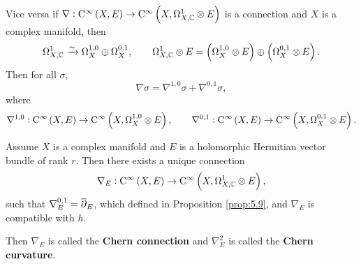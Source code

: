 Vice versa if $ \nabla : \Ci{X, E} \to \COCE{X}{1}{E} $ is a connection and $ X $ is a complex manifold, then
$$ \Omega_{X, \CC}^1 \xrightarrow{\sim} \Omega_X^{1, 0} \oplus \Omega_X^{0, 1}, \qquad \Omega_{X, \CC}^1 \otimes E = \br{\Omega_X^{1, 0} \otimes E} \oplus \br{\Omega_X^{0, 1} \otimes E}. $$
Then for all $ \sigma $,
$$ \nabla\sigma = \nabla^{1, 0}\sigma + \nabla^{0, 1}\sigma, $$
where
$$ \nabla^{1, 0} : \Ci{X, E} \to \COE{X}{1, 0}{E}, \qquad \nabla^{0, 1} : \Ci{X, E} \to \COE{X}{0, 1}{E}. $$

\begin{theorem}
Assume $ X $ is a complex manifold and $ E $ is a holomorphic Hermitian vector bundle of rank $ r $. Then there exists a unique connection
$$ \nabla_E : \Ci{X, E} \to \COCE{X}{1}{E}, $$
such that $ \nabla_E^{0, 1} = \overline{\partial}_E $, which defined in Proposition \ref{prop:5.9}, and $ \nabla_E $ is compatible with $ h $.
\end{theorem}

Then $ \nabla_E $ is called the \textbf{Chern connection} and $ \nabla_E^2 $ is called the \textbf{Chern curvature}.

